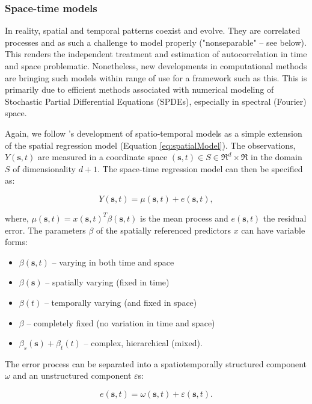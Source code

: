 \documentclass[letterpaper,portrait,11pt]{scrartcl}
\numberwithin{equation}{section}    %
\numberwithin{figure}{section}    %
\numberwithin{table}{section}       %
\begin{document}
\subsubsection{Space-time models}
\label{sec:spacetime}
In reality, spatial and temporal patterns coexist and evolve. They are correlated processes and as such a challenge to model properly ("nonseparable" -- see below). This renders the independent treatment and estimation of autocorrelation in time and space problematic. Nonetheless, new developments in computational methods are bringing such models within range of use for a framework such as this. This is primarily due to efficient methods associated with numerical modeling of Stochastic Partial Differential Equations (SPDEs), especially in spectral (Fourier) space. 

Again, we follow \textcite{banerjee2014hierarchical}'s development of spatio-temporal models as a simple extension of the spatial regression model (Equation \ref{eq:spatialModel}). The observations, $Y(\bm{s},t)$ are measured in a coordinate space $(\bm{s},t) \in S \in \Re^d \times \Re $ in the domain $S$ of dimensionality $d +1$. The space-time regression model can then be specified as:  

\begin{equation}
  \label{eq:spacetimeModel}
  Y(\bm{s},t) = \mu(\bm{s},t) + e(\bm{s},t) , 
\end{equation}

where, $\mu(\bm{s},t) = x(\bm{s},t)^{T} \beta(\bm{s},t)$ is the mean process and $e(\bm{s},t)$ the residual error. The parameters $\beta$ of the spatially referenced predictors $x$ can have variable forms: 

\begin{itemize}
  \item $\beta(\bm{s},t)$ -- varying in both time and space
  \item $\beta(\bm{s})$ -- spatially varying (fixed in time) 
  \item $\beta(t)$ -- temporally varying (and fixed in space)
  \item $\beta$ -- completely fixed (no variation in time and space)
  \item $\beta_{s}(\bm{s}) + \beta_{t}(t)$ -- complex, hierarchical (mixed).
\end{itemize}


The error process can be separated into a spatiotemporally structured component $\omega$ and an unstructured component $\varepsilon$s:

\[ e(\bm{s},t) = \omega(\bm{s},t) +  \varepsilon(\bm{s},t) .\] 
\end{document}
